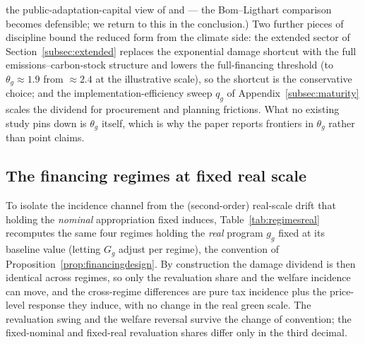 \documentclass[12pt]{article}
\begin{document}
the public-adaptation-capital view of \citet{fried2022seawalls} and
\citet{konradtweder2023} --- the
Bom--Ligthart comparison becomes defensible; we return to this in the
conclusion.) Two further pieces of discipline bound the reduced form from
the climate side:
the extended sector of Section~\ref{subsec:extended} replaces the
exponential damage shortcut with the full emissions--carbon-stock
structure and lowers the full-financing threshold (to
$\theta_g \approx 1.9$ from $\approx 2.4$ at the illustrative scale), so
the shortcut is the conservative choice; and the implementation-efficiency
sweep $q_g$ of Appendix~\ref{subsec:maturity} scales the dividend for
procurement and planning frictions. What no existing study pins down is
$\theta_g$ itself, which is why
the paper reports frontiers in $\theta_g$ rather than point claims.



\subsection{The financing regimes at fixed real scale}
\label{subsec:regimesreal}

To isolate the incidence channel from the (second-order) real-scale drift that
holding the \emph{nominal} appropriation fixed induces, Table~\ref{tab:regimesreal}
recomputes the same four regimes holding the \emph{real} program $g_g$ fixed at
its baseline value (letting $G_g$ adjust per regime), the convention of
Proposition~\ref{prop:financingdesign}. By construction the damage dividend is
then identical across regimes, so only the revaluation share and the
welfare incidence can move, and the cross-regime differences are pure tax
incidence plus the price-level response they induce, with no change in the real
green scale. The revaluation swing and the welfare reversal survive the change
of convention; the fixed-nominal and fixed-real revaluation shares differ only
in the third decimal.
\end{document}
